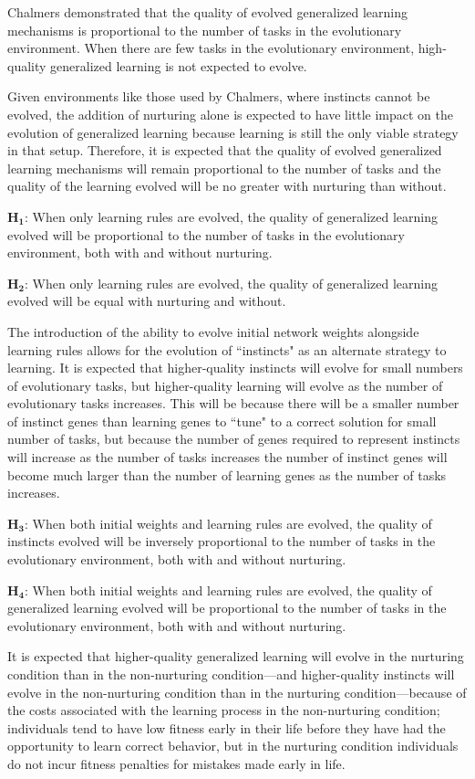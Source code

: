 \documentclass[master]{outhesis}
\begin{document}
Chalmers demonstrated that the quality of evolved generalized learning mechanisms is proportional to the number of tasks in the evolutionary environment. When there are few tasks in the evolutionary environment, high-quality generalized learning is not expected to evolve.

Given environments like those used by Chalmers, where instincts cannot be evolved, the addition of nurturing alone is expected to have little impact on the evolution of generalized learning because learning is still the only viable strategy in that setup. Therefore, it is expected that the quality of evolved generalized learning mechanisms will remain proportional to the number of tasks and the quality of the learning evolved will be no greater with nurturing than without.

$\mathbf{H_1}$: When only learning rules are evolved, the quality of generalized learning evolved will be proportional to the number of tasks in the evolutionary environment, both with and without nurturing.

$\mathbf{H_2}$: When only learning rules are evolved, the quality of generalized learning evolved will be equal with nurturing and without.

The introduction of the ability to evolve initial network weights alongside learning rules allows for the evolution of ``instincts" as an alternate strategy to learning.
It is expected that higher-quality instincts will evolve for small numbers of evolutionary tasks, but higher-quality learning will evolve as the number of evolutionary tasks increases.
This will be because there will be a smaller number of instinct genes than learning genes to ``tune" to a correct solution for small number of tasks, but because the number of genes required to represent instincts will increase as the number of tasks increases the number of instinct genes will become much larger than the number of learning genes as the number of tasks increases.

$\mathbf{H_3}$: When both initial weights and learning rules are evolved, the quality of instincts evolved will be inversely proportional to the number of tasks in the evolutionary environment, both with and without nurturing.

$\mathbf{H_4}$: When both initial weights and learning rules are evolved, the quality of generalized learning evolved will be proportional to the number of tasks in the evolutionary environment, both with and without nurturing.

It is expected that higher-quality generalized learning will evolve in the nurturing condition than in the non-nurturing condition---and higher-quality instincts will evolve in the non-nurturing condition than in the nurturing condition---because of the costs associated with the learning process in the non-nurturing condition; individuals tend to have low fitness early in their life before they have had the opportunity to learn correct behavior, but in the nurturing condition individuals do not incur fitness penalties for mistakes made early in life.
\end{document}
